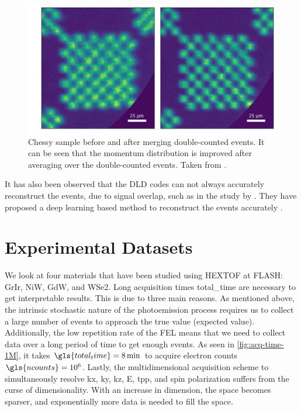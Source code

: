 \begin{figure}[h]
    \centering
    \includegraphics[width=0.7\linewidth]{images/chessy_deblurring_merged_events.png}
    \caption{Chessy sample before and after merging double-counted events. It can be seen that the momentum distribution is improved after averaging over the double-counted events. Taken from \cite{heberStudiesUltrafastDynamics2024}.}
    \label{fig:chessy-distribution}
\end{figure}


It has also been observed that the \gls{DLD} codes can not always accurately reconstruct the events, due to signal overlap, such as in the study by \citeauthor{knipferDeepLearningbasedSpatiotemporal2024}. They have proposed a deep learning based method to reconstruct the events accurately \cite{knipferDeepLearningbasedSpatiotemporal2024}.

\section{Experimental Datasets}\label{section:datasets}
We look at four materials that have been studied using \gls{HEXTOF} at \gls{FLASH}: \gls{GrIr}, \gls{NiW}, \gls{GdW}, and \gls{WSe2}. Long acquisition times \gls{total_time} are necessary to get interpretable results. This is due to three main reasons. As mentioned above, the intrinsic stochastic nature of the photoemission process requires us to collect a large number of events to approach the true value (expected value). Additionally, the low repetition rate of the \gls{FEL} means that we need to collect data over a long period of time to get enough events. As seen in \cref{fig:acq-time-1M}, it takes $\gls{total_time}=\qty{8}{\min}$ to acquire electron counts $\gls{ncounts}=\num{e6}$. Lastly, the multidimensional acquisition scheme to simultaneously resolve \gls{kx}, \gls{ky}, \gls{kz}, \gls{E}, \gls{tpp}, and spin polarization suffers from the curse of dimensionality. With an increase in dimension, the space becomes sparser, and exponentially more data is needed to fill the space.


